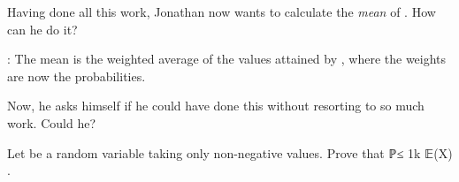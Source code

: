 			Having done all this work, Jonathan now wants to calculate the \emph{mean} of . How can he do it?

			: The mean is the weighted average of the values attained by , where the weights are now the probabilities.
			
			\blank[4*big]

			Now, he asks himself if he could have done this without resorting to so much work. Could he?
		\stopexercise

		\startexercise [title={Markov inequality}]
			Let  be a random variable taking only non-negative values. Prove that
			\startformula
				ℙ\bcrl[X ≥ k] ≤ \frac1k 𝔼(X) .
			\stopformula
		\stopexercise

	\stopsection


\stopchapter